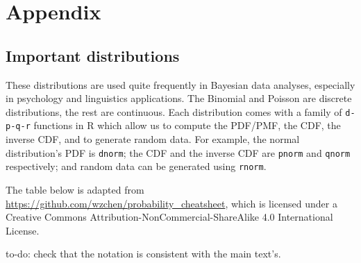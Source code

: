\documentclass[12pt,]{krantz}
\theoremstyle{definition}
\theoremstyle{definition}
\theoremstyle{definition}
\theoremstyle{remark}
\begin{document}
\hypertarget{part-appendix}{%
\part{Appendix}\label{part-appendix}}

\hypertarget{important-distributions}{%
\chapter{Important distributions}\label{important-distributions}}

These distributions are used quite frequently in Bayesian data analyses, especially in psychology and linguistics applications. The Binomial and Poisson are discrete distributions, the rest are continuous. Each distribution comes with a family of \texttt{d-p-q-r} functions in R which allow us to compute the PDF/PMF, the CDF, the inverse CDF, and to generate random data. For example, the normal distribution's PDF is \texttt{dnorm}; the CDF and the inverse CDF are \texttt{pnorm} and \texttt{qnorm} respectively; and random data can be generated using \texttt{rnorm}.

The table below is adapted from \url{https://github.com/wzchen/probability_cheatsheet}, which is licensed under a Creative Commons Attribution-NonCommercial-ShareAlike 4.0 International License.

to-do: check that the notation is consistent with the main text's.
\end{document}
